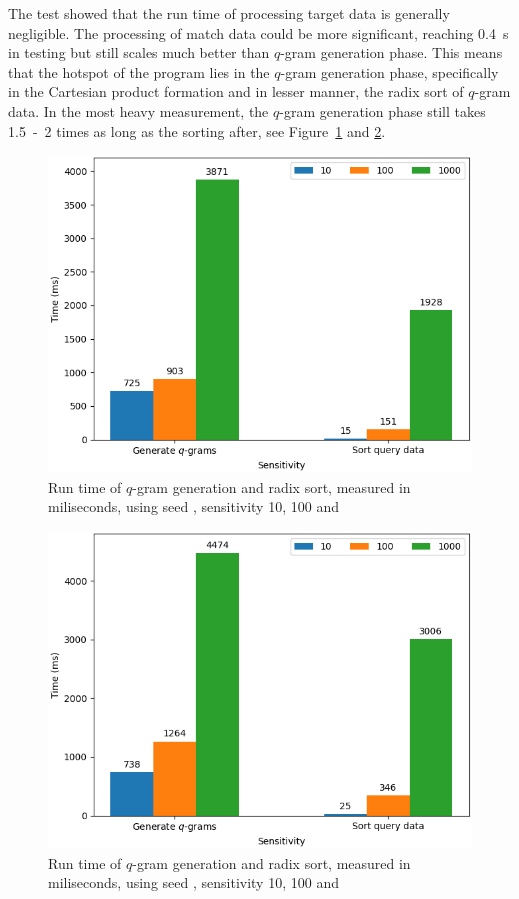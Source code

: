 \documentclass[twoside,a4paper,bsc]{master}
\newcommand{\Qgram}[1]{\(#1\)-gram}
\begin{document}
The test showed that the run time of processing target data is generally
negligible. The processing of match data could be more significant,
reaching
0.4~s in testing but still scales much better than \Qgram{q} generation
phase.
This means that the hotspot of the program lies in the \Qgram{q} generation
phase, specifically in the Cartesian product formation and in lesser
manner,
the radix sort of \Qgram{q} data. In the most heavy measurement, the
\Qgram{q}
generation phase still takes 1.5~-~2 times as long as the sorting after,
see
Figure~\ref{fig:hotspot_w6} and \ref{fig:hotspot_w7}.
\begin{figure}
\centering
\includegraphics[scale=0.6]{graphics/hotspot_w6.png}
\caption{Run time of \Qgram{q} generation and radix sort, measured in
miliseconds,
using seed , sensitivity 10, 100 and }
\label{fig:hotspot_w6}
\end{figure}
\begin{figure}
\centering
\includegraphics[scale=0.6]{graphics/hotspot_w7.png}
\caption{Run time of \Qgram{q} generation and radix sort, measured in
miliseconds,
using seed , sensitivity 10, 100 and }
\label{fig:hotspot_w7}
\end{figure}
\end{document}
